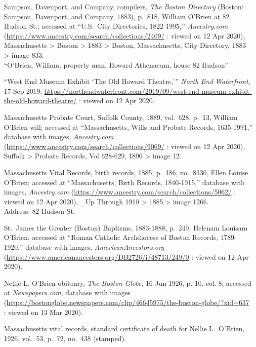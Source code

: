 \begin{thebibliography}{999}
	Sampson, Davenport, and Company, compilers, \textit{The Boston Directory} (Boston: Sampson, Davenport, and Company, 1883), p.\ 818, William O'Brien at 82 Hudson St.; accessed at ``U.S.\ City Directories, 1822-1995,’’ \textit{Ancestry.com} (\url{https://www.ancestry.com/search/collections/2469/} : viewed on 12 Apr 2020), Massachusetts > Boston > 1883 > Boston, Massachusetts, City Directory, 1883 > image 833.\\
	``O'Brien, William, property man, Howard Athenaeum, house 82 Hudson''
	
	``West End Museum Exhibit `The Old Howard Theatre,''' \textit{North End Waterfront}, 17 Sep 2019;  \url{https://northendwaterfront.com/2019/09/west-end-museum-exhibit-the-old-howard-theatre/} : viewed on 12 Apr 2020.
	
	Massachusetts Probate Court, Suffolk County, 1889, vol.\ 628, p.\ 13, William O'Brien will; accessed at ``Massachusetts, Wills and Probate Records, 1635-1991,'' database with images, \textit{Ancestry.com} (\url{https://www.ancestry.com/search/collections/9069/} : viewed on 12 Apr 2020), Suffolk > Probate Records, Vol 628-629, 1890 > image 12.
	
	Massachusetts Vital Records, birth records, 1885, p.\ 186, no.\ 8330, Ellen Louise O'Brien; accessed at ``Massachusetts, Birth Records, 1840-1915,'' database with images, \textit{Ancestry.com} (\url{https://www.ancestry.com/search/collections/5062/} : viewed on 12 Apr 2020), \_Up Through 1910 > 1885 > image 1266.\\
	Address: 82 Hudson St.
	
	St.\ James the Greater (Boston) Baptisms, 1883-1888, p.\ 249, Helenam Louisam O'Brien; accessed at ``Roman Catholic Archdiocese of Boston Records, 1789-1920,'' database with images, \textit{AmericanAncestors.org} (\url{https://www.americanancestors.org/DB2726/i/48713/249/0} : viewed on 12 Apr 2020).
	
	Nellie L. O’Brien obituary, \textit{The Boston Globe}, 16 Jun 1926, p. 10, col. 8; accessed at \textit{Newspapers.com}, database with images (\url{https://bostonglobe.newspapers.com/clip/46645975/the-boston-globe/?xid=637} : viewed on 13 Mar 2020). 
	
	Massachusetts vital records, standard certificate of death for Nellie L.\ O'Brien, 1926, vol.\ 53, p.\ 72, no.\ 438 (stamped).
	

\end{thebibliography}
